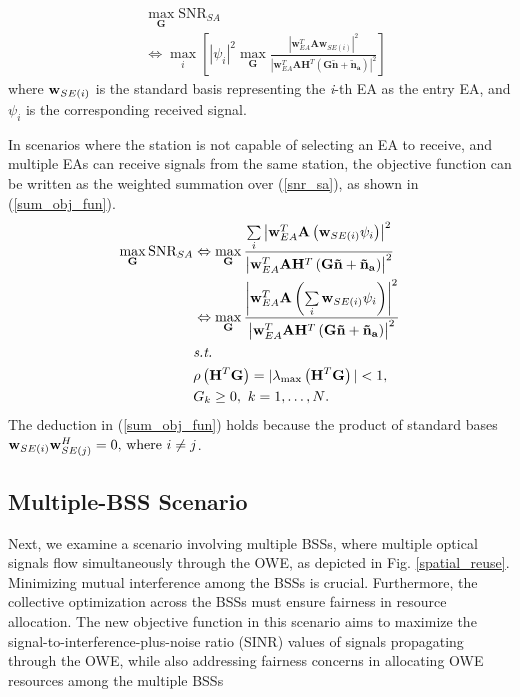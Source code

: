 \begin{equation}
\begin{aligned}
& \max_\mathbf{G} \text{SNR}_{SA} \\
& \Leftrightarrow 
\max_{i}\left[ |\psi_i|^2 \max_\mathbf{G} 
\frac{{{{\left|\mathbf{w}_{EA}^T\mathbf{A}{\mathbf{w}_{SE(i)}} \right|}^2}}}{{{{\left| {\mathbf{w}_{EA}^T\mathbf{A}{\mathbf{H}^T}\left( {\mathbf{G\tilde n + }{{\mathbf{\tilde n}}_\mathbf{a}}} \right)}\right|}^2}}}\right]
\end{aligned}
\end{equation}
where ${{\bf{w}}_{SE(i)}}$ is the standard basis representing the \textit{i}-th EA as the entry EA, and $\psi_i$ is the corresponding received signal.
\par
In scenarios where the station is not capable of selecting an EA to receive, and multiple EAs can receive signals from the same station, the objective function can be written as the weighted summation over (\ref{snr_sa}), as shown in (\ref{sum_obj_fun}).
\begin{equation}
\label{sum_obj_fun}
\begin{aligned}
\mathop {\max }\limits_{\bf{G}} \text{SNR}_{SA}
&\Leftrightarrow \mathop {\max }\limits_{\bf{G}} \frac{{\sum\limits_i {{{\left| {{\bf{w}}_{EA}^T{\bf{A}}\left( {{\bf{w}}_{SE(i)}} \psi_i \right)} \right|}^2}}}}{{{{\left| {{\bf{w}}_{EA}^T{\bf{A}}{{\bf{H}}^T}\left( {{\bf{G\tilde n}} + {{{\bf{\tilde n}}}_{\bf{a}}}} \right)} \right|}^2}}}\\
&\Leftrightarrow \mathop {\max }\limits_{\bf{G}} \frac{{{{\left| {{\bf{w}}_{EA}^T{\bf{A}}\left(\sum\limits_i {{{\bf{w}}_{SE(i)}}} \psi_i \right) } \right|}^2}}}{{{{\left| {{\bf{w}}_{EA}^T{\bf{A}}{{\bf{H}}^T}\left( {{\bf{G\tilde n}} + {{{\bf{\tilde n}}}_{\bf{a}}}} \right)} \right|}^2}}} \\
&\textit{s.t.}\\
& \rho\left({\mathbf{H}^T}\mathbf{G}\right)=|\lambda_{\max}\left({\mathbf{H}^T}\mathbf{G}\right)|<1,\\
& G_k\geq0,{\ }k=1,\dots, N \text{.}
\end{aligned}
\end{equation}
The deduction in (\ref{sum_obj_fun}) holds because the product of standard bases ${{{\bf{w}}_{SE(i)}}}{{{\bf{w}}_{SE(j)}^H}}=0 \text{, where } i\neq j$.

\subsection{Multiple-BSS Scenario}
Next, we examine a scenario involving multiple BSSs, where multiple optical signals flow simultaneously through the OWE, as depicted in Fig. \ref{spatial_reuse}. Minimizing mutual interference among the BSSs is crucial. Furthermore, the collective optimization across the BSSs must ensure fairness in resource allocation. The new objective function in this scenario aims to maximize the signal-to-interference-plus-noise ratio (SINR) values of signals propagating through the OWE, while also addressing fairness concerns in allocating OWE resources among the multiple BSSs

